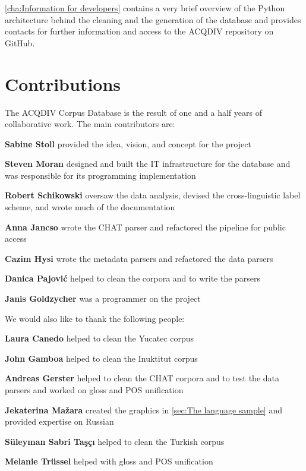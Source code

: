 \documentclass[a4paper, 11pt]{book}
\begin{document}
\autoref{cha:Information for developers} contains a very brief overview of the Python architecture behind the cleaning and the generation of the database and provides contacts for further information and access to the ACQDIV repository on GitHub. 

\section{Contributions}
\label{sec:Contributions}

The ACQDIV Corpus Database is the result of one and a half years of collaborative work. The main contributors are: 

\begin{itemize*}
	\item \textbf{Sabine Stoll} provided the idea, vision, and concept for the project
	\item \textbf{Steven Moran} designed and built the IT infrastructure for the database and was responsible for its programming implementation
	\item \textbf{Robert Schikowski} oversaw the data analysis, devised the cross-linguistic label scheme, and wrote much of the documentation
	\item \textbf{Anna Jancso} wrote the CHAT parser and refactored the pipeline for public access
	\item \textbf{Cazim Hysi} wrote the metadata parsers and refactored the data parsers
	\item \textbf{Danica Pajović} helped to clean the corpora and to write the parsers
	\item \textbf{Janis Goldzycher} was a programmer on the project
\end{itemize*}

\noindent We would also like to thank the following people: 

\begin{itemize*}
	\item \textbf{Laura Canedo} helped to clean the Yucatec corpus
	\item \textbf{John Gamboa} helped to clean the Inuktitut corpus
	\item \textbf{Andreas Gerster} helped to clean the CHAT corpora and to test the data parsers and worked on gloss and POS unification
	\item \textbf{Jekaterina Mažara} created the graphics in \autoref{sec:The language sample} and provided expertise on Russian
	\item \textbf{Süleyman Sabri Taşçı} helped to clean the Turkish corpus
	\item \textbf{Melanie Trüssel} helped with gloss and POS unification
\end{itemize*}
\end{document}
